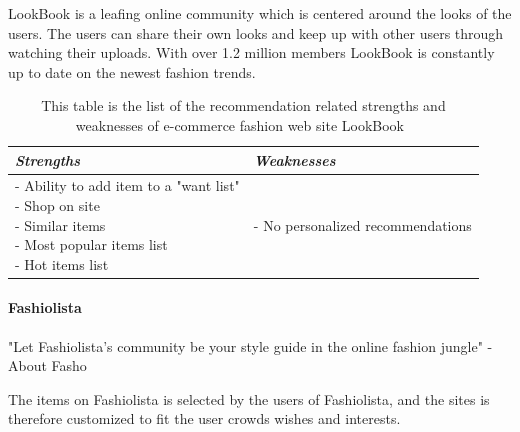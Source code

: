     LookBook is a leafing online community which is centered around the looks of the users.
    The users can share their own looks and keep up with other users through watching their uploads.
    With over 1.2 million members LookBook is constantly up to date on the newest fashion trends.
    \begin{table}[H]
        \centering
        \begin{tabular}{l|l}
            \toprule
            \emph{Strengths} & \emph{Weaknesses} \\ \hline
            \pbox{9cm}{
                - Ability to add item to a "want list" \\
                - Shop on site \\
                - Similar items \\
                - Most popular items list \\
                - Hot items list
            } & \pbox{9cm}{
                - No personalized recommendations \\
            } \\ \bottomrule
        \end{tabular}
        \caption[Recommendation related strengths and weaknesses of LookBook~\cite{LookBook}]{This table is the list of the recommendation related strengths and weaknesses of e-commerce fashion web site LookBook~\cite{LookBook}}
        \label{table:ecommenreceLookBook}
    \end{table}

\paragraph{Fashiolista} %
\label{par:fashiolista}
    "Let Fashiolista's community be your style guide in the online fashion jungle" - About Fasho~\cite{Fashiolista}

    The items on Fashiolista is selected by the users of Fashiolista, and the sites is therefore customized to fit the user crowds wishes and interests.

